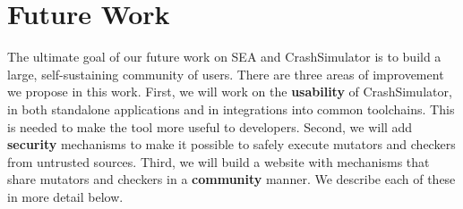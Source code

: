 \section{Future Work}


The ultimate goal of our future work on SEA and CrashSimulator is to build
a large, self-sustaining community of users.  
%
%
%
%
%
%
There are three areas of improvement we propose in this work.  First, we
will work on the {\bf usability} of CrashSimulator, in both standalone 
applications and in integrations into common toolchains.  This is needed to 
make the tool more useful to developers.  Second, we will add {\bf security}
mechanisms to make it possible to safely execute mutators and checkers from 
untrusted sources.  Third,
we will build a website with mechanisms that share mutators and checkers in a 
{\bf community} manner.  We describe each of these in more detail below.


